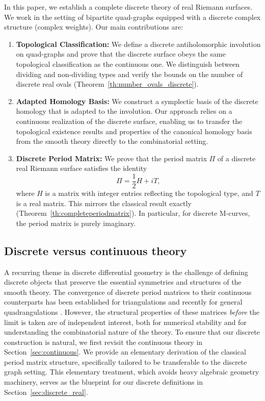 \documentclass[11pt,a4paper]{article}
\theoremstyle{definition}
\begin{document}
In this paper, we establish a complete discrete theory of real Riemann surfaces. We work in the setting of bipartite quad-graphs equipped with a discrete complex structure (complex weights). Our main contributions are:
\begin{enumerate}
	\item \textbf{Topological Classification:} We define a discrete antiholomorphic involution on quad-graphs and prove that the discrete surface obeys the same topological classification as the continuous one. We distinguish between dividing and non-dividing types and verify the bounds on the number of discrete real ovals (Theorem~\ref{th:number_ovals_discrete}).
	\item \textbf{Adapted Homology Basis:} We construct a symplectic basis of the discrete homology that is adapted to the involution. Our approach relies on a continuous realization of the discrete surface, enabling us to transfer the topological existence results and properties of the canonical homology basis from the smooth theory directly to the combinatorial setting.
	\item \textbf{Discrete Period Matrix:} We prove that the period matrix $\Pi$ of a discrete real Riemann surface satisfies the identity
	\[
	\Pi = \frac{1}{2} H + i T,
	\]
	where $H$ is a matrix with integer entries reflecting the topological type, and $T$ is a real matrix. This mirrors the classical result exactly (Theorem~\ref{th:completeperiodmatrix}). In particular, for discrete M-curves, the period matrix is purely imaginary.
\end{enumerate}

\subsection{Discrete versus continuous theory}

A recurring theme in discrete differential geometry is the challenge of defining discrete objects that preserve the essential symmetries and structures of the smooth theory.
The convergence of discrete period matrices to their continuous counterparts has been established for triangulations \cite{BoSk12} and recently for general quadrangulations \cite{G23}.
However, the structural properties of these matrices \emph{before} the limit is taken are of independent interest, both for numerical stability and for understanding the combinatorial nature of the theory.
To ensure that our discrete construction is natural, we first revisit the continuous theory in Section~\ref{sec:continuous}. We provide an elementary derivation of the classical period matrix structure, specifically tailored to be transferable to the discrete graph setting. This elementary treatment, which avoids heavy algebraic geometry machinery, serves as the blueprint for our discrete definitions in Section~\ref{sec:discrete_real}.
\end{document}
